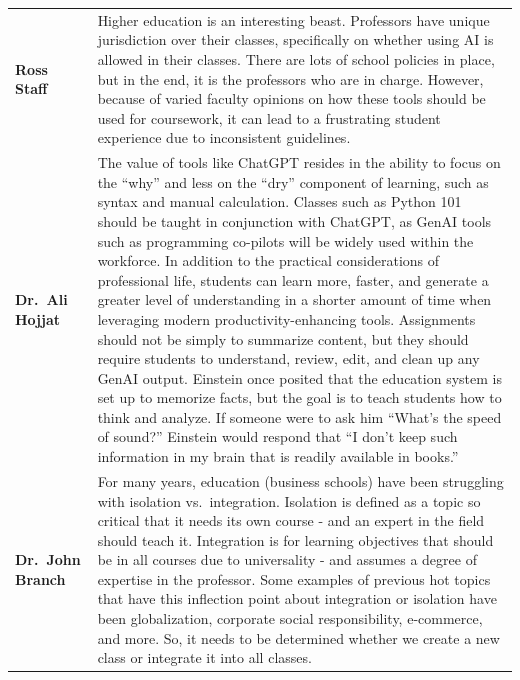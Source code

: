 \documentclass[
]{book}
\begin{document}
\begin{longtable}[]{@{}
  >{\raggedright\arraybackslash}p{}
  >{\raggedright\arraybackslash}p{}@{}}
\toprule\noalign{}
\endhead
\bottomrule\noalign{}
\endlastfoot
\textbf{Ross Staff} & Higher education is an interesting beast. Professors have unique jurisdiction over their classes, specifically on whether using AI is allowed in their classes. There are lots of school policies in place, but in the end, it is the professors who are in charge. However, because of varied faculty opinions on how these tools should be used for coursework, it can lead to a frustrating student experience due to inconsistent guidelines. \\
\textbf{Dr.~Ali Hojjat} & The value of tools like ChatGPT resides in the ability to focus on the ``why'' and less on the ``dry'' component of learning, such as syntax and manual calculation. Classes such as Python 101 should be taught in conjunction with ChatGPT, as GenAI tools such as programming co-pilots will be widely used within the workforce. In addition to the practical considerations of professional life, students can learn more, faster, and generate a greater level of understanding in a shorter amount of time when leveraging modern productivity-enhancing tools. Assignments should not be simply to summarize content, but they should require students to understand, review, edit, and clean up any GenAI output. Einstein once posited that the education system is set up to memorize facts, but the goal is to teach students how to think and analyze. If someone were to ask him ``What's the speed of sound?'' Einstein would respond that ``I don't keep such information in my brain that is readily available in books.'' \\
\textbf{Dr.~John Branch} & For many years, education (business schools) have been struggling with isolation vs.~integration. Isolation is defined as a topic so critical that it needs its own course - and an expert in the field should teach it. Integration is for learning objectives that should be in all courses due to universality - and assumes a degree of expertise in the professor. Some examples of previous hot topics that have this inflection point about integration or isolation have been globalization, corporate social responsibility, e-commerce, and more. So, it needs to be determined whether we create a new class or integrate it into all classes. \\

\end{longtable}
\end{document}
